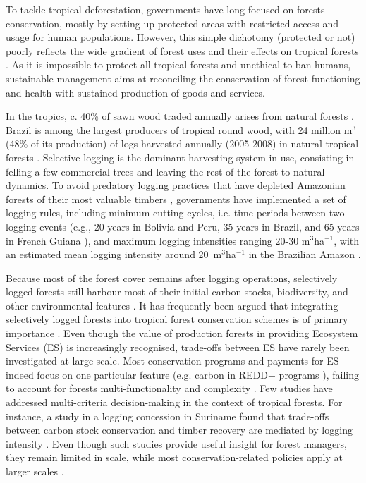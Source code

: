 \documentclass{article}
\begin{document}
To tackle tropical deforestation, governments have long focused on forests conservation, mostly by setting up protected areas with restricted access and usage for human populations. However, this simple dichotomy (protected or not) poorly reflects the wide gradient of forest uses and their effects on tropical forests \cite{Gibson2011,DeCastroSolar2015}. As it is impossible to protect all tropical forests and unethical to ban humans, sustainable management aims at reconciling the conservation of forest functioning and health with sustained production of goods and services. 

In the tropics, c. 40\% of sawn wood traded annually arises from natural forests \cite{Payn2015}. Brazil is among the largest producers of tropical round wood, with 24 million m$^3$ (48\% of its production) of logs harvested annually (2005-2008) in natural tropical forests \cite{Blaser2011}. Selective logging is the dominant harvesting system in use, consisting in felling a few commercial trees and leaving the rest of the forest to natural dynamics. 
To avoid predatory logging practices that have depleted Amazonian forests of their most valuable timbers \cite{Richardson2016}, governments have implemented a set of logging rules, including minimum cutting cycles, i.e. time periods between two logging events (e.g., 20 years in Bolivia and Peru, 35 years in Brazil, and 65 years in French Guiana \cite{Blaser2011}), and maximum logging intensities ranging 20-30 m$^3$ha$^{-1}$, with an estimated mean logging intensity around 20~m$^3$ha$^{-1}$ in the Brazilian Amazon \cite{Asner2005}.

Because most of the forest cover remains after logging operations, selectively logged forests still harbour most of their initial carbon stocks, biodiversity, and other environmental features \cite{Putz2012}. It has frequently been argued that integrating selectively logged forests into tropical forest conservation schemes is of primary importance \cite{Edwards2014a}. Even though the value of production forests in providing Ecosystem Services (ES) is increasingly recognised, trade-offs between ES have rarely been investigated at large scale. Most conservation programs and payments for ES indeed focus on one particular feature (e.g. carbon in REDD+ programs \cite{Laing2016}), failing to account for forests multi-functionality and complexity \cite{VanderPlas2017}. Few studies have addressed multi-criteria decision-making in the context of tropical forests. For instance, a study in a logging concession in Suriname found that trade-offs between carbon stock conservation and timber recovery are mediated by logging intensity \cite{Roopsind2018}. Even though such studies provide useful insight for forest managers, they remain limited in scale, while most conservation-related policies apply at larger scales \cite{Hein2006b}. 
\end{document}
